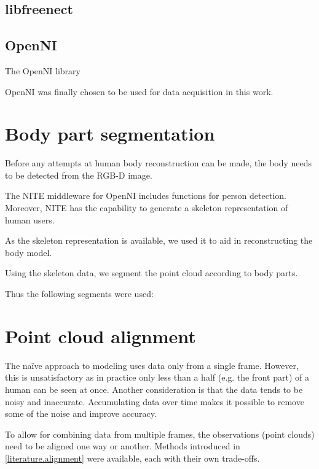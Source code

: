 \subsection{libfreenect}

\subsection{OpenNI}

The OpenNI library \citep{OpenNI}

OpenNI was finally chosen to be used for data acquisition in this work.

\section{Body part segmentation}

Before any attempts at human body reconstruction can be made, the body needs to be detected from the RGB-D image. %

The NITE middleware for OpenNI \citep{NITE}
includes functions for person detection. Moreover, NITE has the capability to generate a skeleton representation of human users.

As the skeleton representation is available, we used it to aid in reconstructing the body model.

Using the skeleton data, we segment the point cloud according to body parts.

 Thus the following segments were used:


\section{Point cloud alignment}

The naïve approach to modeling uses data only from a single frame. However, this is unsatisfactory as in practice only less than a half (e.g. the front part) of a human can be seen at once. Another consideration is that the data tends to be noisy and inaccurate. Accumulating data over time makes it possible to remove some of the noise and improve accuracy.

To allow for combining data from multiple frames, the observations (point clouds) need to be aligned one way or another. Methods introduced in \autoref{literature.alignment} were available, each with their own trade-offs.


